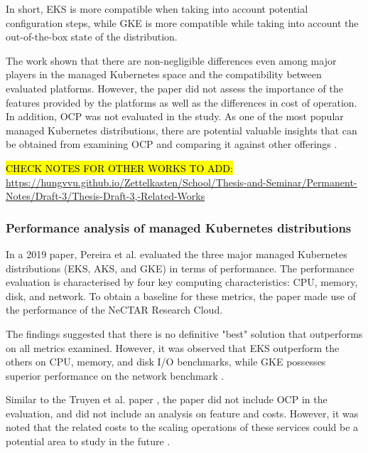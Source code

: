 In short, EKS is more compatible when taking into account potential configuration steps, while GKE is more compatible while taking into account the out-of-the-box state of the distribution.

The work shown that there are non-negligible differences even among major players in the managed Kubernetes space and the compatibility between evaluated platforms. However, the paper did not assess the importance of the features provided by the platforms as well as the differences in cost of operation. In addition, OCP was not evaluated in the study. As one of the most popular managed Kubernetes distributions, there are potential valuable insights that can be obtained from examining OCP and comparing it against other offerings \cite{redhatinc.StateKubernetesSecurity2024, vrabicDigitalTwinsUnderstanding2018, portworxKubernetesAdoptionSurvey2021, broadcomStateKubernetes20232023}.

\hl{CHECK NOTES FOR OTHER WORKS TO ADD:} \url{https://hungvvu.github.io/Zettelkasten/School/Thesis-and-Seminar/Permanent-Notes/Draft-3/Thesis-Draft-3,-Related-Works}

\subsubsection{Performance analysis of managed Kubernetes distributions}

In a 2019 paper, Pereira et al. \cite{pereiraferreiraPerformanceEvaluationContainers2019} evaluated the three major managed Kubernetes distributions (EKS, AKS, and GKE) in terms of performance. The performance evaluation is characterised by four key computing characteristics: CPU, memory, disk, and network. To obtain a baseline for these metrics, the paper made use of the performance of the NeCTAR Research Cloud.

The findings suggested that there is no definitive "best" solution that outperforms on all metrics examined. However, it was observed that EKS outperform the others on CPU, memory, and disk I/O benchmarks, while GKE possesses superior performance on the network benchmark \cite{pereiraferreiraPerformanceEvaluationContainers2019}.

Similar to the Truyen et al. paper \cite{truyenManagingFeatureCompatibility2020}, the paper did not include OCP in the evaluation, and did not include an analysis on feature and costs. However, it was noted that the related costs to the scaling operations of these services could be a potential area to study in the future \cite{pereiraferreiraPerformanceEvaluationContainers2019}.

